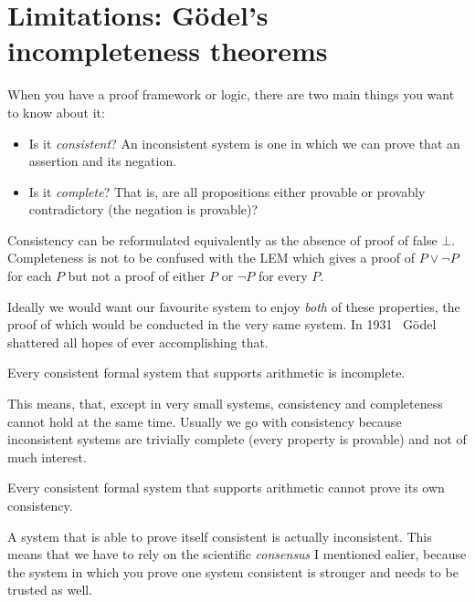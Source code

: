 \section{Limitations: Gödel's incompleteness theorems}

When you have a proof framework or logic, there are two main things you want to
know about it:
\begin{itemize}
  \item Is it \emph{consistent}? An inconsistent system is one in which we can
  prove that an assertion and its negation.
  \item Is it \emph{complete}? That is, are all propositions either provable
  or provably contradictory (\ie the negation is provable)?
\end{itemize}

Consistency can be reformulated equivalently as the absence of proof of false
\(\bot\).
Completeness is not to be confused with the \acrshort{LEM} which gives a proof
of \(P \vee \neg P\) for each \(P\) but not a proof of either \(P\) or
\(\neg P\) for every \(P\).

Ideally we would want our favourite system to enjoy \emph{both} of these
properties, the proof of which would be conducted in the very same system.
In 1931~ Gödel shattered all hopes of ever
accomplishing that.

\begin{theorem}
  Every consistent formal system that supports arithmetic is incomplete.
\end{theorem}

This means, that, except in very small systems, consistency and completeness
cannot hold at the same time. Usually we go with consistency because
inconsistent systems are trivially complete (every property is provable) and not
of much interest.

\begin{theorem}
  Every consistent formal system that supports arithmetic cannot prove its
  own consistency.
\end{theorem}
A system that is able to prove itself consistent is actually inconsistent.
This means that we have to rely on the scientific \emph{consensus} I mentioned
ealier, because the system in which you prove one system consistent is stronger
and needs to be trusted as well.

